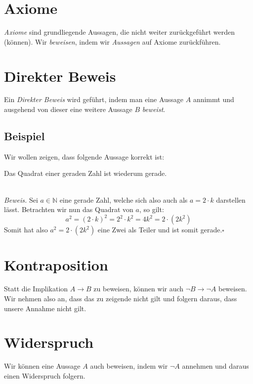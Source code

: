 \documentclass{scrreprt}
\newenvironment{proof}{\emph{\\Beweis.}}{}
\newcommand{\NN}{\mathbb{N}}
\begin{document}
    \section{Axiome}
    \emph{Axiome} sind grundliegende Aussagen, die nicht weiter zurückgeführt werden (können). Wir \emph{beweisen}, indem wir \emph{Aussagen} auf Axiome zurückführen.

    \section{Direkter Beweis}
    Ein \emph{Direkter Beweis} wird geführt, indem man eine Aussage $A$ annimmt und ausgehend von dieser eine weitere Aussage $B$ \emph{beweist}.

    \subsection{Beispiel}
    Wir wollen zeigen, dass folgende Aussage korrekt ist:
    \begin{center}
        Das Quadrat einer geraden Zahl ist wiederum gerade.
    \end{center}
    \begin{proof}
        Sei $a \in \NN$ eine gerade Zahl, welche sich also auch als $a = 2 \cdot k$ darstellen lässt. Betrachten wir nun das Quadrat von $a$, so gilt:
        \begin{equation*}
            a^2 = (2 \cdot k)^2 = 2^2 \cdot k^2 = 4 k^2 = 2 \cdot (2 k^2)
        \end{equation*}
        Somit hat also $a^2 = 2 \cdot (2 k^2)$ eine Zwei als Teiler und ist somit gerade.$\square$
    \end{proof}

    \section{Kontraposition}
    Statt die Implikation $A \rightarrow B$ zu beweisen, können wir auch $\neg B \rightarrow \neg A$ beweisen. Wir nehmen also an, dass das zu zeigende nicht gilt und folgern daraus, dass unsere Annahme nicht gilt.

    \section{Widerspruch}
    Wir können eine Aussage $A$ auch beweisen, indem wir $\neg A$ annehmen und daraus einen Widerspruch folgern.
\end{document}
